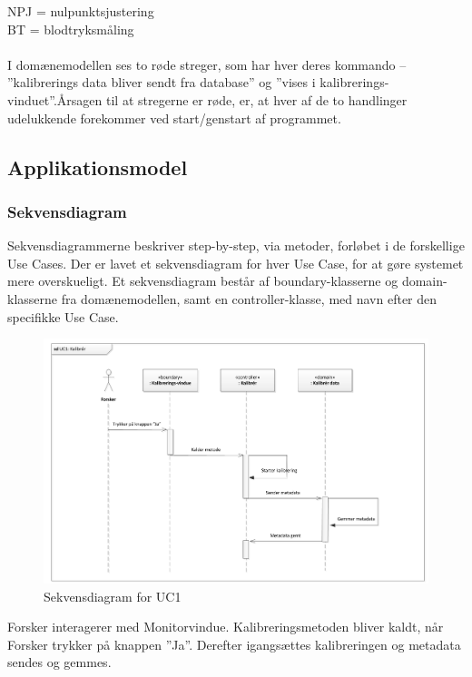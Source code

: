 NPJ = nulpunktsjustering\\
BT = blodtryksmåling
\\ \\
I domænemodellen ses to røde streger, som har hver deres kommando – ”kalibrerings data bliver sendt fra database” og ”vises i kalibrerings-vinduet”.Årsagen til at stregerne er røde, er, at hver af de to handlinger udelukkende forekommer ved start/genstart af programmet.

\subsection{Applikationsmodel}

\subsubsection{Sekvensdiagram}
Sekvensdiagrammerne beskriver step-by-step, via metoder, forløbet i de forskellige Use Cases. Der er lavet et sekvensdiagram for hver Use Case, for at gøre systemet mere overskueligt. Et sekvensdiagram består af boundary-klasserne og domain-klasserne fra domænemodellen, samt en controller-klasse, med navn efter den specifikke Use Case.

\begin{figure}[H]
	\centering
	\includegraphics[width=1\textwidth]{Figurer/Snip20151104_31}
	\caption{Sekvensdiagram for UC1}
\end{figure}

Forsker interagerer med Monitorvindue. Kalibreringsmetoden bliver kaldt, når Forsker trykker på knappen ”Ja”. Derefter igangsættes kalibreringen og metadata sendes og gemmes. 

